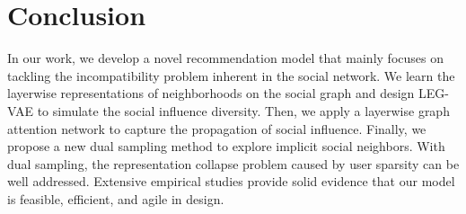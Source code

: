 \documentclass[letterpaper]{article} %
\begin{document}
\section{Conclusion}
In our work, we develop a novel recommendation model that mainly focuses on tackling the incompatibility problem inherent in the social network. We learn the layerwise representations of neighborhoods on the social graph and design LEG-VAE to simulate the social influence diversity. Then, we apply a layerwise graph attention network to capture the propagation of social influence. Finally, we propose a new dual sampling method to explore implicit social neighbors. With dual sampling, the representation collapse problem caused by user sparsity can be well addressed. Extensive empirical studies provide solid evidence that our model is feasible, efficient, and agile in design.


\end{document}
